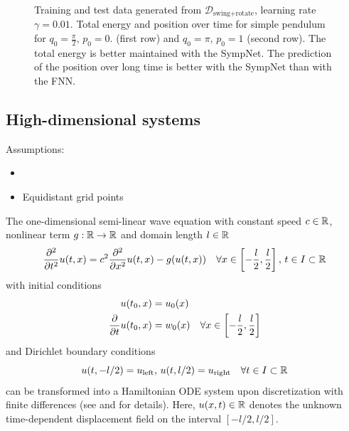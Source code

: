 \documentclass[twoside,a4paper]{article}
\begin{document}
\begin{figure}
	\caption{
	Training and test data generated from $\mathcal{D}_{\text{swing+rotate}}$, 
	learning rate $\gamma = 0.01$.
	Total energy and position over time for simple pendulum for $q_0 = \frac{\pi}{2},\, p_0 = 0$.
	(first row) and $q_0 = \pi,\, p_0=1$ (second row).
	The total energy is better maintained with the SympNet.
	The prediction of the position over long time is better with the SympNet than with the FNN.}
\end{figure}

\FloatBarrier
\subsection{High-dimensional systems}


Assumptions:
\begin{itemize}
	\item {}
	\item Equidistant grid points
\end{itemize}


The one-dimensional semi-linear wave equation with constant speed $c \in \mathbb{R}$, nonlinear term 
$g : \mathbb{R} \to \mathbb{R}$ and domain length $l \in \mathbb{R}$
\begin{equation*}
	\frac{\partial^2}{\partial t^2} u(t,x) = 
	c^2 \frac{\partial^2}{\partial x^2} u(t,x) - g(u(t,x)) 
	\quad \forall x \in \left[ -\frac{l}{2},\frac{l}{2} \right], 
	\, t \in I \subset \mathbb{R}
\end{equation*}
with initial conditions
\begin{align*}
	u(t_0,x) &= u_0(x) \\
	\frac{\partial }{\partial t} u(t_0,x) &= w_0(x) \quad \forall x \in \left[ -\frac{l}{2},\frac{l}{2} \right]
\end{align*}
and Dirichlet boundary conditions
\begin{equation*}
	u(t,-l/2) = u_{\text{left}}, \, u(t,l/2) = u_{\text{right}} \quad \forall t \in I \subset \mathbb{R}
\end{equation*}
can be transformed into a Hamiltonian ODE system upon discretization with finite differences
(see \cite{2006ham_pde} and \cite{peng2016} for details). 
Here, $u(x,t) \in \mathbb{R}$ denotes the unknown time-dependent displacement field on the interval $[-l/2, l/2]$.
\end{document}
